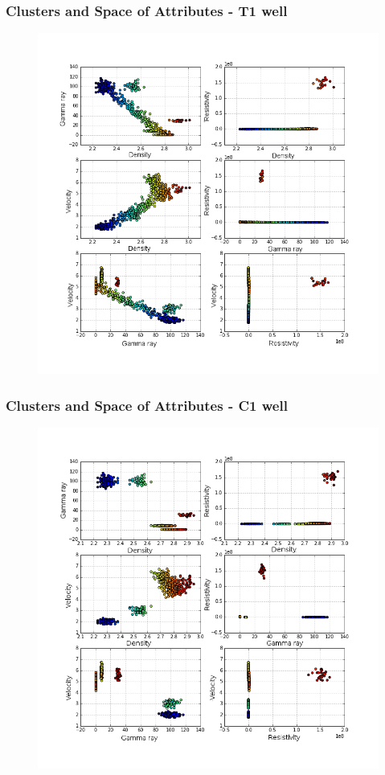 \documentclass[aspectratio=10]{beamer} %
\begin{document}
\begin{frame}
	\frametitle{Clusters and Space of Attributes - T1 well}
	    
	\begin{figure}
	 \includegraphics[scale=0.29]{Imagens/cluterpocoT1.png}
	\end{figure}
	
\end{frame}


\begin{frame}
\frametitle{Clusters and Space of Attributes - C1 well}

\begin{figure}
	\includegraphics[scale=0.29]{Imagens/cluterpocoC1.png}
\end{figure}

\end{frame}
\end{document}
